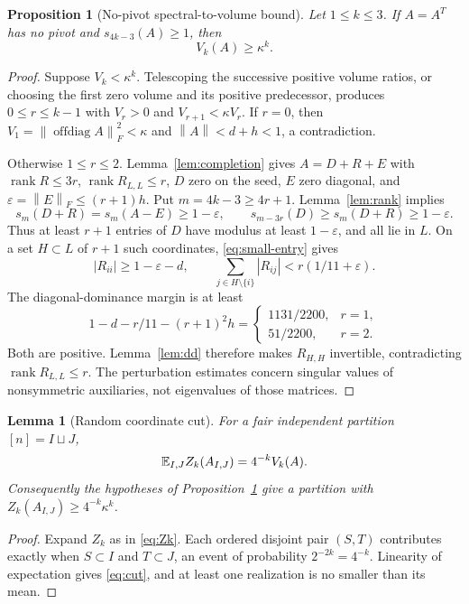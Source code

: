 \documentclass[11pt]{article}
\numberwithin{equation}{section}
\newtheorem{lemma}[theorem]{Lemma}
\newtheorem{proposition}[theorem]{Proposition}
\theoremstyle{definition}\newtheorem{definition}[theorem]{Definition}
\theoremstyle{remark}\newtheorem{remark}[theorem]{Remark}
\newcommand{\1}{\mathbf 1}\newcommand{\diag}{\operatorname{diag}}
\newcommand{\rank}{\operatorname{rank}}\newcommand{\tr}{\operatorname{tr}}
\newcommand{\off}{\operatorname{offdiag}}\newcommand{\supp}{\operatorname{supp}}
\newcommand{\norm}[1]{\left\lVert#1\right\rVert}\newcommand{\abs}[1]{\left|#1\right|}
\begin{document}
\begin{proposition}[No-pivot spectral-to-volume bound]\label{prop:volume}
Let $1\le k\le3$. If $A=A^T$ has no pivot and $s_{4k-3}(A)\ge1$, then
\begin{equation}\label{eq:volume-lower}
 V_k(A)\ge\kappa^k.
\end{equation}
\end{proposition}
\begin{proof}
Suppose $V_k<\kappa^k$. Telescoping the successive positive volume ratios, or choosing the first zero volume and its positive predecessor, produces $0\le r\le k-1$ with $V_r>0$ and $V_{r+1}<\kappa V_r$. If $r=0$, then $V_1=\norm{\off A}_F^2<\kappa$ and $\norm A<d+h<1$, a contradiction.

Otherwise $1\le r\le2$. Lemma~\ref{lem:completion} gives $A=D+R+E$ with $\rank R\le3r$, $\rank R_{L,L}\le r$, $D$ zero on the seed, $E$ zero diagonal, and $\varepsilon=\norm E_F\le(r+1)h$. Put $m=4k-3\ge4r+1$. Lemma~\ref{lem:rank} implies
\[
 s_m(D+R)=s_m(A-E)\ge1-\varepsilon,\qquad
 s_{m-3r}(D)\ge s_m(D+R)\ge1-\varepsilon.
\]
Thus at least $r+1$ entries of $D$ have modulus at least $1-\varepsilon$, and all lie in $L$. On a set $H\subset L$ of $r+1$ such coordinates, \eqref{eq:small-entry} gives
\[
 |R_{ii}|\ge1-\varepsilon-d,\qquad
 \sum_{j\in H\setminus\{i\}}|R_{ij}|<r(1/11+\varepsilon).
\]
The diagonal-dominance margin is at least
\[
 1-d-r/11-(r+1)^2h=
 \begin{cases}1131/2200,&r=1,\\51/2200,&r=2.\end{cases}
\]
Both are positive. Lemma~\ref{lem:dd} therefore makes $R_{H,H}$ invertible, contradicting $\rank R_{L,L}\le r$. The perturbation estimates concern singular values of nonsymmetric auxiliaries, not eigenvalues of those matrices.
\end{proof}

\begin{lemma}[Random coordinate cut]\label{lem:cut}
For a fair independent partition $[n]=I\sqcup J$,
\begin{equation}\label{eq:cut}
 \mathbb E_{I,J}Z_k(A_{I,J})=4^{-k}V_k(A).
\end{equation}
Consequently the hypotheses of Proposition~\ref{prop:volume} give a partition with $Z_k(A_{I,J})\ge4^{-k}\kappa^k$.
\end{lemma}
\begin{proof}
Expand $Z_k$ as in \eqref{eq:Zk}. Each ordered disjoint pair $(S,T)$ contributes exactly when $S\subset I$ and $T\subset J$, an event of probability $2^{-2k}=4^{-k}$. Linearity of expectation gives \eqref{eq:cut}, and at least one realization is no smaller than its mean.
\end{proof}
\end{document}
